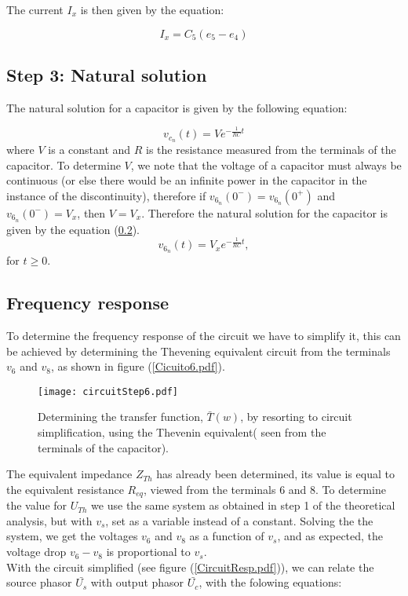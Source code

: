 The current $I_x$ is then given by the equation:

\begin{equation}
    I_x = C_5(e_5-e_4) 
\end{equation}

\subsection{Step 3: Natural solution}
The natural solution for a capacitor is given by the following equation:

\begin{equation}
    v_{c_n}(t) = V e^{-\frac{1}{RC}t}
\end{equation}
where $V$ is a constant and $R$ is the resistance measured from the terminals of the capacitor.
To determine $V$, we note that the voltage of a capacitor must always be continuous (or else there would be an infinite power in the capacitor in the instance of the discontinuity), therefore if $v_{6_n}(0^-) = v_6_n(0^+)$ and  $v_{6_n}(0^-) = V_x$, then $V = V_x$. 
Therefore the natural solution for the capacitor is given by the equation (\ref{}).
\begin{equation}
    v_{6_n}(t) = V_x e^{-\frac{1}{RC}t}, 
\end{equation}
for $t \geq 0$.


\subsection{Frequency response}
To determine the frequency response of the circuit we have to simplify it, this can be achieved by determining the Thevening equivalent circuit from the terminals $v_6$ and $v_8$, as shown in figure (\ref{Cicuito6.pdf}).

\begin{figure}[H] \centering
  \texttt{[image: circuitStep6.pdf]}
  \caption{Determining the transfer function, $\bar{T}(w)$, by resorting to circuit simplification, using the Thevenin equivalent( seen from the terminals of the capacitor).}
  \label{fig:mesh}
\end{figure}



The equivalent impedance $Z_{Th}$ has already been determined, its value is equal to the equivalent resistance $R_{eq}$, viewed from the terminals 6 and 8. To determine the value for $U_{Th}$ we use the same system as obtained in step 1 of the theoretical analysis, but with $v_s$, set as a variable instead of a constant. Solving the the system, we get the voltages $v_6$ and $v_8$ as a function of $v_s$, and as expected, the voltage drop $v_6 - v_8$ is proportional to $v_s$.
\\ With the circuit simplified (see figure (\ref{CircuitResp.pdf})), we can relate the source phasor $\bar{U_s}$ with output phasor $\bar{U_c}$, with the folowing equations:

